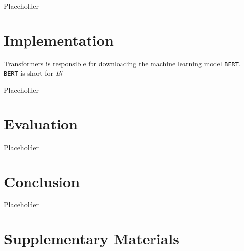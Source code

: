             Placeholder
            
    \section{Implementation}
    \label{sec:implementation}
            
            Transformers is responsible for downloading the machine learning model \texttt{BERT}.
            \texttt{BERT} is short for \emph{Bi}


        Placeholder

    \section{Evaluation}
    \label{sec:evaluation}

        Placeholder

    \section{Conclusion}
    \label{sec:conclusion}

        Placeholder

    \section{Supplementary Materials}
    \label{sec:supplementary-materials}


    \pagebreak

    
    


